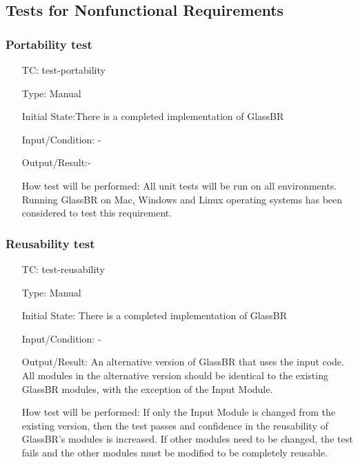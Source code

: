 \documentclass[12pt, titlepage]{article}
\newcounter{testnum} %
\newcommand{\progname}{GlassBR}
\begin{document}
\subsection{Tests for Nonfunctional Requirements} \label{sec_NFRTests}

\subsubsection{Portability test}

\begin{enumerate}[label=TC\arabic*:,ref={\arabic*}]
	
\item [TC\refstepcounter{testnum}\thetestnum: \label{TC_Portability}] 
test-portability

Type: Manual
					
Initial State:There is a completed implementation of \progname{}
					
Input/Condition: -
					
Output/Result:-

					
How test will be performed: All unit tests will be run on all environments. Running \progname{} on Mac, Windows and
Linux operating systems has been considered to test this requirement.  
					
\end{enumerate}

\subsubsection{Reusability test}

\begin{enumerate}[label=TC\arabic*:,ref={\arabic*}]
	
\item [TC\refstepcounter{testnum}\thetestnum: \label{TC_Reusability}] 
test-reusability

Type: Manual

Initial State: There is a completed implementation of \progname{}
	
Input/Condition: -

Output/Result: An alternative version of \progname{} that uses the input code. 
All modules in the alternative version should be identical to the existing 
\progname{} modules, with the exception of the Input Module.

How test will be performed:  If only the Input Module is changed from the 
existing version, then the test passes and confidence in the reusability of 
\progname{}'s modules is increased. If other modules need to be changed, the 
test fails and the other modules must be modified to be completely reusable.
	
\end{enumerate}
\end{document}
